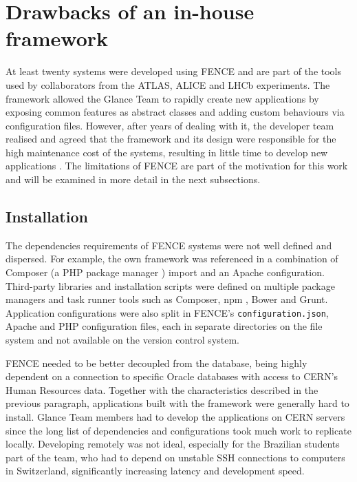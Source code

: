 \section{Drawbacks of an in-house framework}

At least twenty systems were developed using FENCE \cite{pinhao-tcc} and are part of the tools used by collaborators from the ATLAS, ALICE and LHCb experiments. The framework allowed the Glance Team to rapidly create new applications by exposing common features as abstract classes and adding custom behaviours via configuration files. However, after years of dealing with it, the developer team realised and agreed that the framework and its design were responsible for the high maintenance cost of the systems, resulting in little time to develop new applications \cite{de-jesus-tcc}. The limitations of FENCE are part of the motivation for this work and will be examined in more detail in the next subsections. 

\subsection{Installation}

The dependencies requirements of FENCE systems were not well defined and dispersed. For example, the own framework was referenced in a combination of Composer (a PHP package manager \cite{composer-website}) import and an Apache configuration. Third-party libraries and installation scripts were defined on multiple package managers and task runner tools such as Composer, npm \cite{npm-website}, Bower \cite{bower-website} and Grunt\cite{grunt-website}. Application configurations were also split in FENCE's \texttt{configuration.json}, Apache and PHP configuration files, each in separate directories on the file system and not available on the version control system.

FENCE needed to be better decoupled from the database, being highly dependent on a connection to specific Oracle databases with access to CERN's Human Resources data. Together with the characteristics described in the previous paragraph, applications built with the framework were generally hard to install. Glance Team members had to develop the applications on CERN servers since the long list of dependencies and configurations took much work to replicate locally. Developing remotely was not ideal, especially for the Brazilian students part of the team, who had to depend on unstable SSH connections to computers in Switzerland, significantly increasing latency and development speed. 

